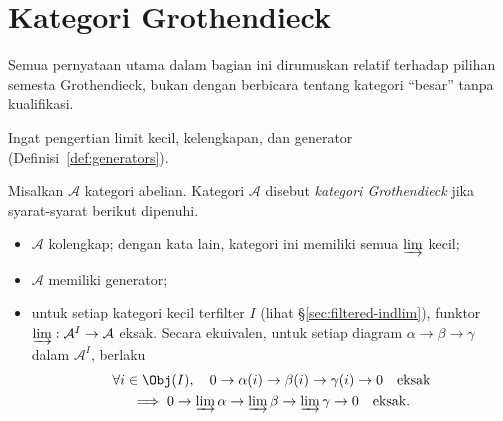
\section{Kategori Grothendieck}\label{sec:Grothendieck-cat}
\hypertarget{o014.aljabr2.chapter2.grothendieck-categories}{ }

Semua pernyataan utama dalam bagian ini dirumuskan relatif terhadap pilihan
semesta Grothendieck, bukan dengan berbicara tentang kategori
``besar'' tanpa kualifikasi.

Ingat pengertian limit kecil, kelengkapan, dan generator
(Definisi~\ref{def:generators}).

\begin{definisi}\label{def:Grothendieck-cat}
	Misalkan $\mathcal{A}$ kategori abelian. Kategori $\mathcal{A}$ disebut
	\emph{kategori Grothendieck} jika syarat-syarat berikut dipenuhi.
	\begin{itemize}
		\item $\mathcal{A}$ kolengkap; dengan kata lain, kategori ini memiliki
		semua $\varinjlim$ kecil;
		\item $\mathcal{A}$ memiliki generator;
		\item untuk setiap kategori kecil terfilter $I$
		(lihat \S\ref{sec:filtered-indlim}), funktor
		$\varinjlim:\mathcal{A}^I\to\mathcal{A}$ eksak. Secara ekuivalen,
		untuk setiap diagram $\alpha\to\beta\to\gamma$ dalam $\mathcal{A}^I$,
		berlaku
		\begin{multline*}
			\forall i\in\Obj(I),\quad
			0\to\alpha(i)\to\beta(i)\to\gamma(i)\to0
			\quad\text{eksak} \\
			\implies 0\to\varinjlim\alpha\to\varinjlim\beta
			\to\varinjlim\gamma\to0\quad\text{eksak}.
		\end{multline*}
	\end{itemize}
\end{definisi}

